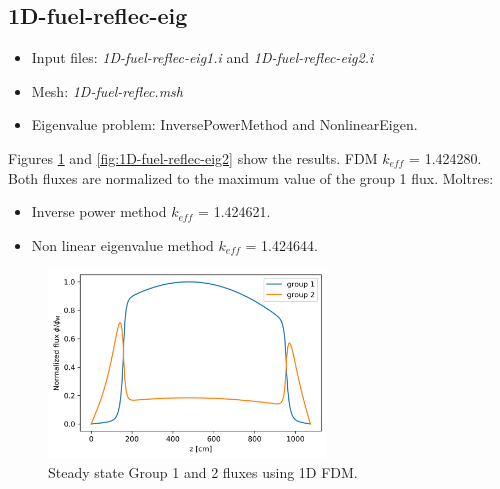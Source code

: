 \documentclass[11pt,letterpaper]{article}
\begin{document}
\subsection{1D-fuel-reflec-eig}

	\begin{itemize}
		\item Input files: \textit{1D-fuel-reflec-eig1.i} and \textit{1D-fuel-reflec-eig2.i}
		\item Mesh: \textit{1D-fuel-reflec.msh}
		\item Eigenvalue problem: InversePowerMethod and NonlinearEigen.
	\end{itemize}

Figures \ref{fig:1D-fuel-reflec-eig1} and \ref{fig:1D-fuel-reflec-eig2} show the results.
FDM $k_{eff}$ = 1.424280. Both fluxes are normalized to the maximum value of the group 1 flux.
Moltres: 
\begin{itemize}
	\item Inverse power method $k_{eff}$ = 1.424621.
	\item Non linear eigenvalue method $k_{eff}$ = 1.424644.
\end{itemize}

	\begin{figure}[htbp!]
		\centering
		\includegraphics[height=5cm]{1D-fuel-reflec-eig-FDM}
		\caption{Steady state Group 1 and 2 fluxes using 1D FDM.}
		\label{fig:1D-fuel-reflec-eig1}
	\end{figure}
\end{document}
